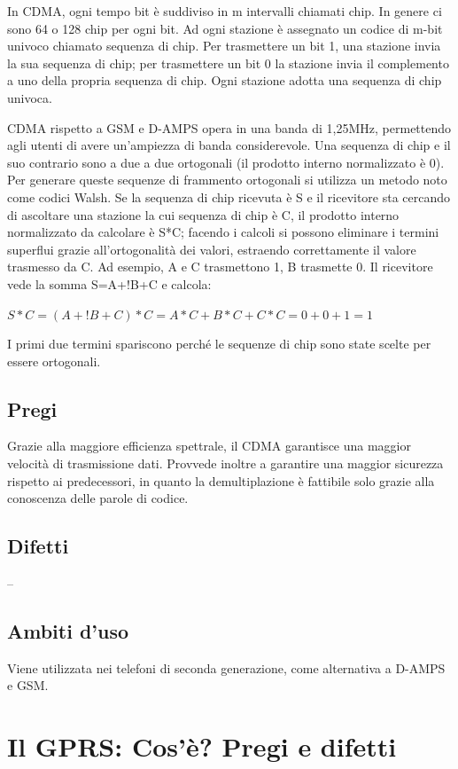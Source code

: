 In CDMA, ogni tempo bit è suddiviso in m intervalli chiamati chip. In genere ci sono 64 o 128 chip per ogni bit. Ad ogni stazione è assegnato un codice di m-bit univoco chiamato sequenza di chip.
Per trasmettere un bit 1, una stazione invia la sua sequenza di chip; per trasmettere un bit 0 la stazione invia il complemento a uno della propria sequenza di chip.
Ogni stazione adotta una sequenza di chip univoca.

CDMA rispetto a GSM e D-AMPS opera in una banda di 1,25MHz, permettendo agli utenti di avere un’ampiezza di banda considerevole.
Una sequenza di chip e il suo contrario sono a due a due ortogonali (il prodotto interno normalizzato è 0). Per generare queste sequenze di frammento ortogonali si utilizza un metodo noto come codici Walsh. 
Se la sequenza di chip ricevuta è S e il ricevitore sta cercando di ascoltare una stazione la cui sequenza di chip è C, il prodotto interno normalizzato da calcolare è S*C; facendo i calcoli si possono eliminare i termini superflui grazie all’ortogonalità dei valori, estraendo correttamente il valore trasmesso da C. 
Ad esempio, A e C trasmettono 1, B trasmette 0. Il ricevitore vede la somma S=A+!B+C e calcola:
\begin{center}
$S*C=(A+!B+C)*C=A*C+B*C+C*C=0+0+1=1$
\end{center}
I primi due termini spariscono perché le sequenze di chip sono state scelte per essere ortogonali.
\subsection{Pregi}
Grazie alla maggiore efficienza spettrale, il CDMA garantisce una maggior velocità di trasmissione dati.
Provvede inoltre a garantire una maggior sicurezza rispetto ai predecessori, in quanto la demultiplazione è fattibile solo grazie alla conoscenza delle parole di codice.
\subsection{Difetti}
--
\subsection{Ambiti d'uso}
Viene utilizzata nei telefoni di seconda generazione, come alternativa a D-AMPS e GSM.

\section{Il GPRS: Cos’è? Pregi e difetti}

